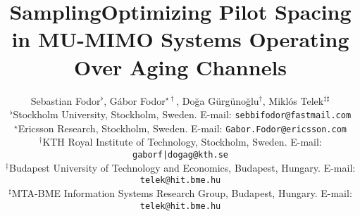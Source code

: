 \documentclass[conference, a4paper, 10pt]{IEEEtran}
\begin{document}
\title{Sampling}
\singlespacing

\begin{comment}
\title{MU-MIMO Receiver Design and Performance Analysis in Time-Varying Rayleigh Fading}%
\title{On the Achievable SINR in MU-MIMO Systems Operating in Time-Varying Rayleigh Fading}
\title{Performance Analysis of MU-SIMO Systems Operating in Continuous Time-Varying Fading Channels}
\title{On Pilot Spacing and Power Control in MU-MIMO Systems with Continuous Time-Varying Rayleigh Fading Channels}
\title{Optimizing Pilot Spacing in MU-MIMO Systems with Continuous Time-Varying Fast Fading Channels}
\title{Optimizing Pilot Spacing in MU-MIMO Systems Operating in the Presence of Channel Aging}
\end{comment}
\title{Optimizing Pilot Spacing in MU-MIMO Systems Operating Over Aging Channels}

\singlespacing
\author{
Sebastian Fodor$^\flat$, G\'{a}bor Fodor$^{\star\dag}$, Do\u{g}a G\"{u}rg\"{u}no\u{g}lu$^{\dag}$,
Mikl\'{o}s Telek$^{\ddag\sharp}$ \\
\small $^\flat$Stockholm University, Stockholm, Sweden. E-mail: \texttt{sebbifodor@fastmail.com}\\
\small $^\star$Ericsson Research, Stockholm, Sweden. E-mail: \texttt{Gabor.Fodor@ericsson.com}\\
\small $^\dag$KTH Royal Institute of Technology, Stockholm, Sweden. E-mail: \texttt{gaborf|dogag@kth.se}\\
\small $^\ddag$Budapest University of Technology and Economics, Budapest, Hungary. E-mail: \texttt{telek@hit.bme.hu}\\
\small $^\sharp$MTA-BME Information Systems Research Group, Budapest, Hungary. E-mail: \texttt{telek@hit.bme.hu}
}
\maketitle
\pagestyle{plain}


\end{document}
